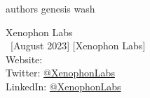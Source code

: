 \documentclass[
        a4paper, %
	8pt, %
]{CSSullivanBusinessReport}
\begin{document}

\newpage

\pagecolor{white}
\color{black}

\begin{appendices}

    {authors}
    \newpage
    {genesis}
    \newpage
    {wash}
\end{appendices}


\newpage

\pagecolor{bg}
\color{white}

\thispagestyle{empty} %

\begin{fullwidth} %
	\vspace*{-0.075\textheight} %
	\vspace{0.9\textheight} %
        {\LARGE Xenophon Labs}\\
        \vspace{0.2cm}
        \small
	\textcopyright~[August 2023] [Xenophon Labs] \\
        \vspace{1cm}
        Website: \\
        \vspace{0.2cm}
        Twitter: \href{https://twitter.com/XenophonLabs}{@XenophonLabs}\\
        \vspace{0.2cm}
        LinkedIn: \href{https://www.linkedin.com/company/xenophon-labs/about/}{@XenophonLabs}\\
\end{fullwidth}
\end{document}

